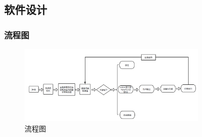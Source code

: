 \documentclass{zjureport}
\begin{document}
        \subsection{软件设计}
            \subsubsection{流程图}

            \begin{figure}[thp]
                \centering
                \includegraphics[width = 0.8\textwidth]{figure/软件框图.png}
                \caption{流程图}
            \end{figure}
\end{document}
